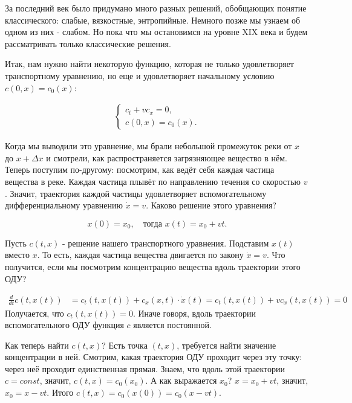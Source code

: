 За последний век было придумано много разных решений, обобщающих понятие классического: слабые, вязкостные, энтропийные. Немного позже мы узнаем об одном из них - слабом. Но пока что мы остановимся на уровне XIX века и будем рассматривать только классические решения.

Итак, нам нужно найти некоторую функцию, которая не только удовлетворяет транспортному уравнению, но еще и удовлетворяет начальному условию $ c (0, x) = c_0 (x) $:

\begin{align}
    \begin{cases} 
        c_t + v c_x = 0, \\
        c (0, x) = c_0 (x).
    \end{cases}
\label{transport}
\end{align}

Когда мы выводили это уравнение, мы брали небольшой промежуток реки от $x$ до $ x + \Delta x $ и смотрели, как распространяется загрязняющее вещество в нём. Теперь поступим по-другому: посмотрим, как ведёт себя каждая частица вещества в реке. Каждая частица плывёт по направлению течения со скоростью $v$. Значит, траектория каждой частицы удовлетворяет вспомогательному дифференциальному уравнению $ \dot x = v $. Каково решение этого уравнения?

\[
	x(0) = x_0,\quad \text{тогда } x(t) = x_0 + v t .
\]


Пусть $ c (t, x) $ - решение нашего транспортного уравнения. Подставим $ x(t) $ вместо $x$. То есть, каждая частица вещества двигается по закону $ \dot x = v $. Что получится, если мы посмотрим концентрацию вещества вдоль траектории этого ОДУ?

\begin{align*}
    \frac {d} {dt} c (t, x(t)) & = c_t (t, x(t)) + c_x (x, t) \cdot \dot x (t) = c_t (t, x(t)) + v c_x (t, x(t)) = 0
\end{align*}
Получается, что $ c_t (t, x(t)) = 0 $. Иначе говоря, вдоль траектории вспомогательного ОДУ функция $c$ является постоянной.


Как теперь найти $ c (t,x) $? Есть точка $ (t, x) $, требуется найти значение концентрации в ней. Смотрим, какая траектория ОДУ проходит через эту точку: через неё проходит единственная прямая. Знаем, что вдоль этой траектории $ c = const $, значит, $ c (t, x) = c_0 (x_0) $. А как выражается $ x_0 $? $ x = x_0 + v t $, значит, $ x_0 = x - vt $.
Итого $c(t,x) = c_0(x(0)) = c_0(x-vt)$.

